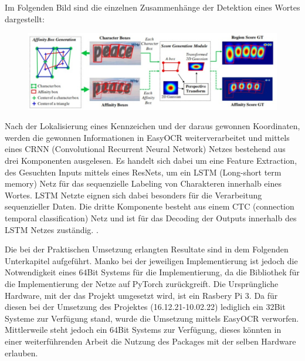 Im Folgenden Bild sind die einzelnen Zusammenhänge der Detektion eines Wortes dargestellt: 
\begin{figure}[H]
	\centering
	\includegraphics[width=0.9\linewidth]{img/baek}
	\caption{}
	\label{fig:baek}
\end{figure}


Nach der Lokalisierung eines Kennzeichen und der daraus gewonnen Koordinaten, werden die gewonnen Informationen in EasyOCR weiterverarbeitet und mittels eines CRNN (Convolutional Recurrent Neural Network) Netzes bestehend aus drei Komponenten ausgelesen. Es handelt sich dabei um eine Feature Extraction, des Gesuchten Inputs mittels eines ResNets, um ein LSTM (Long-short term memory) Netz für das sequenzielle Labeling von Charakteren innerhalb eines Wortes. LSTM Netzte eignen sich dabei besonders für die Verarbeitung sequenzieller Daten. Die dritte Komponente besteht aus einem CTC (connection temporal classification) Netz und ist für das Decoding der Outputs innerhalb des LSTM Netzes zuständig. \autocite[Vgl.][]{JaidedAI70}. 

Die bei der Praktischen Umsetzung erlangten Resultate sind in dem Folgenden Unterkapitel aufgeführt. Manko bei der jeweiligen Implementierung ist jedoch die Notwendigkeit eines 64Bit Systems für die Implementierung, da die Bibliothek für die Implementierung der Netze auf PyTorch zurückgreift. Die Ursprüngliche Hardware, mit der das Projekt umgesetzt wird, ist ein Rasbery Pi 3. Da für diesen bei der Umsetzung des Projektes (16.12.21-10.02.22) lediglich ein 32Bit Systeme zur Verfügung stand, wurde die Umsetzung mittels EasyOCR verworfen. Mittlerweile steht jedoch ein 64Bit Systems zur Verfügung, dieses könnten in einer weiterführenden Arbeit die Nutzung des Packages mit der selben Hardware erlauben.

